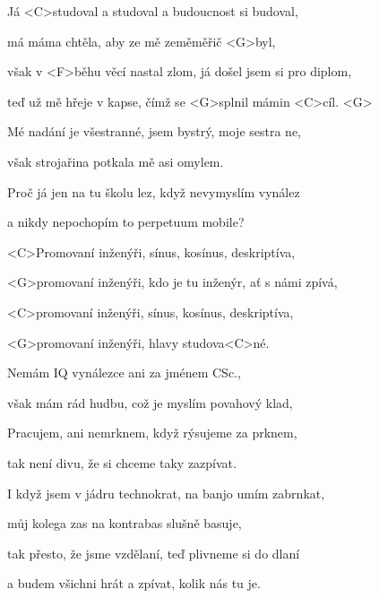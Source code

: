 

\zs
Já <C>studoval a studoval a budoucnost si budoval,

má máma chtěla, aby ze mě zeměměřič <G>byl,

však v <F>běhu věcí nastal zlom, já došel jsem si pro diplom,

teď už mě hřeje v kapse, čímž se <G>splnil mámin <C>cíl. <G>
\ks

\zs
Mé nadání je všestranné, jsem bystrý, moje sestra ne,

však strojařina potkala mě asi omylem.

Proč já jen na tu školu lez, když nevymyslím vynález

a nikdy nepochopím to perpetuum mobile?
\ks

\zr
<C>Promovaní inženýři, sínus, kosínus, deskriptíva,

<G>promovaní inženýři, kdo je tu inženýr, ať s námi zpívá,

<C>promovaní inženýři, sínus, kosínus, deskriptíva,

<G>promovaní inženýři, hlavy studova<C>né.
\kr

\zs
Nemám IQ vynálezce ani za jménem CSc.,

však mám rád hudbu, což je myslím povahový klad,

Pracujem, ani nemrknem, když rýsujeme za prknem,

tak není divu, že si chceme taky zazpívat.
\ks

\zs
I když jsem v jádru technokrat,
na banjo umím zabrnkat,

můj kolega zas na kontrabas slušně basuje,

tak přesto, že jsme vzdělaní, teď plivneme si do dlaní

a budem všichni hrát a zpívat, kolik nás tu je.
\ks

\zr \kr

\kp






















